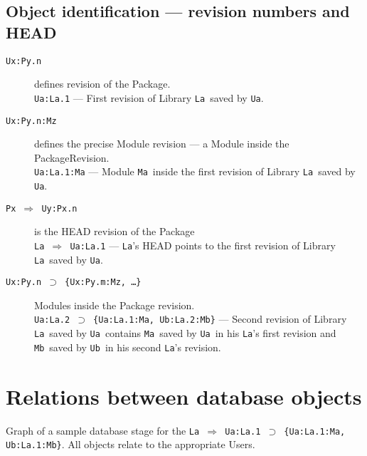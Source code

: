 \documentclass[10pt]{article}
\def\Ua{{\tt Ua}}
\def\Ub{{\tt Ub}}
\def\La{{\tt La}}
\def\Ma{{\tt Ma}}
\def\Mb{{\tt Mb}}
\def\headsto{${\Longrightarrow}$ }
\def\hto{\headsto}
\def\eq{${\supset}$ }
\begin{document}
	\subsection{Object identification --- revision numbers and HEAD}
	\begin{description}
		\item[{\tt Ux:Py.n}] defines revision of the Package.\\ 
			{\tt Ua:La.1} --- First revision of Library \La\ saved by \Ua.
		\item[{\tt Ux:Py.n:Mz}] defines the precise Module revision --- a Module inside the PackageRevision. \\ 
			{\tt Ua:La.1:Ma} --- Module \Ma\ inside the first revision of Library \La\ saved by \Ua.
		\item[{\tt Px \hto  Uy:Px.n}] is the HEAD revision of the Package\\ 
			{\tt La \hto  Ua:La.1} --- \La's HEAD points to the first revision of Library \La\ saved by \Ua.
		\item[{\tt Ux:Py.n \eq \{Ux:Py.m:Mz, \ldots\}}] Modules inside the Package revision.\\ 
			{\tt Ua:La.2 \eq \{Ua:La.1:Ma, Ub:La.2:Mb\}} --- Second revision of Library \La\ saved by 
			\Ua\ contains \Ma\ saved by \Ua\ in his \La's first revision and \Mb\ saved by \Ub\ in his 
			second \La's revision.
	\end{description}

\section{Relations between database objects}
	Graph of a sample database stage for the {\tt La \hto Ua:La.1 \eq \{Ua:La.1:Ma, Ub:La.1:Mb\}}. All objects 
	relate to the appropriate Users.
	
\end{document}
